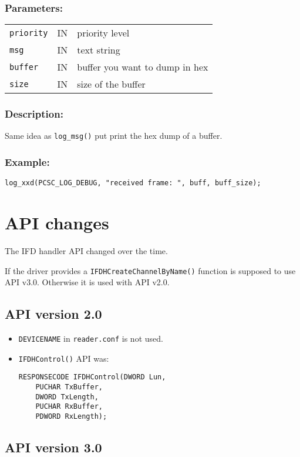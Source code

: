 \documentclass[a4paper,12pt]{article}
\newcommand{\parameters}{\subsubsection{Parameters:}}
\newcommand{\desc}{\subsubsection{Description:}}
\newcommand{\example}{\subsubsection{Example:}}
\begin{document}
\parameters

\begin{tabular}{lll}
\texttt{priority} & IN & priority level \\
\texttt{msg} & IN & text string \\
\texttt{buffer} & IN & buffer you want to dump in hex \\
\texttt{size} & IN & size of the buffer \\
\end{tabular}

\desc

Same idea as \texttt{log\_msg()} put print the hex dump of a buffer.

\example
\begin{verbatim}
log_xxd(PCSC_LOG_DEBUG, "received frame: ", buff, buff_size);
\end{verbatim}


\section{API changes}

The IFD handler API changed over the time.

If the driver provides a \texttt{IFDHCreateChannelByName()} function is
supposed to use API v3.0. Otherwise it is used with API v2.0.


\subsection{API version 2.0}

\begin{itemize}
\item \texttt{DEVICENAME} in \texttt{reader.conf} is not used.

\item \texttt{IFDHControl()} API was:
\begin{verbatim}
RESPONSECODE IFDHControl(DWORD Lun,
    PUCHAR TxBuffer,
    DWORD TxLength,
    PUCHAR RxBuffer,
    PDWORD RxLength);
\end{verbatim}

\end{itemize}


\subsection{API version 3.0}
\end{document}
